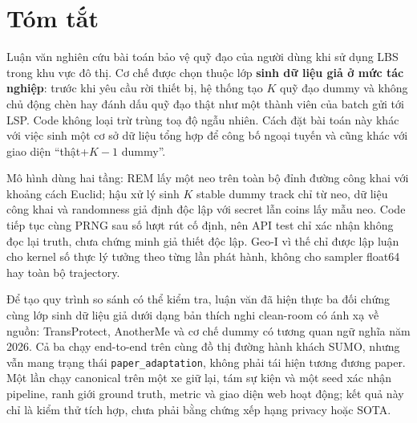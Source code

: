 \documentclass[12pt,a4paper,oneside]{report}
\begin{document}
\chapter*{Tóm tắt}

Luận văn nghiên cứu bài toán bảo vệ quỹ đạo của người dùng khi sử dụng LBS trong khu vực đô thị. Cơ chế được chọn thuộc lớp \textbf{sinh dữ liệu giả ở mức tác nghiệp}: trước khi yêu cầu rời thiết bị, hệ thống tạo $K$ quỹ đạo dummy và không chủ động chèn hay đánh dấu quỹ đạo thật như một thành viên của batch gửi tới LSP. Code không loại trừ trùng toạ độ ngẫu nhiên. Cách đặt bài toán này khác với việc sinh một cơ sở dữ liệu tổng hợp để công bố ngoại tuyến và cũng khác với giao diện ``thật+$K-1$ dummy''.

\begin{center}
\end{center}

Mô hình dùng hai tầng: REM lấy một neo trên toàn bộ đỉnh đường công khai với khoảng cách Euclid; hậu xử lý sinh $K$ stable dummy track chỉ từ neo, dữ liệu công khai và randomness giả định độc lập với secret lẫn coins lấy mẫu neo. Code tiếp tục cùng PRNG sau số lượt rút cố định, nên API test chỉ xác nhận không đọc lại truth, chưa chứng minh giả thiết độc lập. Geo-I vì thế chỉ được lập luận cho kernel số thực lý tưởng theo từng lần phát hành, không cho sampler float64 hay toàn bộ trajectory.

Để tạo quy trình so sánh có thể kiểm tra, luận văn đã hiện thực ba đối chứng cùng lớp sinh dữ liệu giả dưới dạng bản thích nghi clean-room có ánh xạ về nguồn: TransProtect, AnotherMe và cơ chế dummy có tương quan ngữ nghĩa năm 2026. Cả ba chạy end-to-end trên cùng đồ thị đường hành khách SUMO, nhưng vẫn mang trạng thái \texttt{paper\_adaptation}, không phải tái hiện tương đương paper. Một lần chạy canonical trên một xe giữ lại, tám sự kiện và một seed xác nhận pipeline, ranh giới ground truth, metric và giao diện web hoạt động; kết quả này chỉ là kiểm thử tích hợp, chưa phải bằng chứng xếp hạng privacy hoặc SOTA.
\end{document}
